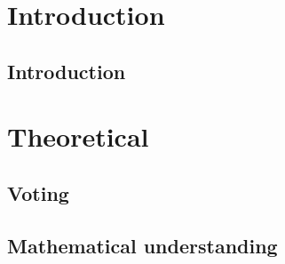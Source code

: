 \documentclass[a4paper]{report}
\theoremstyle{plain}
\begin{document}
\clearpage

\tableofcontents
\lstlistoflistings


\part{Introduction}
\clearpage
\chapter{Introduction}
    
    
    
    
    
    
    
    
    

\part{Theoretical}
 \clearpage
\chapter{Voting} \label{chap:voting}    
    


\clearpage
\chapter{Mathematical understanding}
    
    
    
    
    
    
    
    
    

\clearpage
\end{document}
